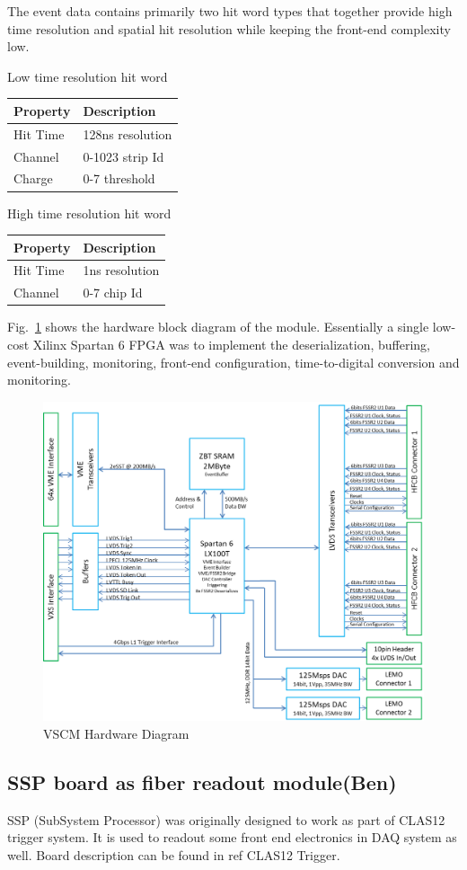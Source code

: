 The event data contains primarily two hit word types that together provide high time resolution and spatial hit resolution while keeping the front-end complexity low.

\begin{center}
	Low time resolution hit word\\
	\begin{tabular}{| l | l |}
		\hline \hline
		Property	& Description		\\
		\hline
		Hit Time	& 128ns resolution	\\
		Channel		& 0-1023 strip Id	\\
		Charge		& 0-7 threshold		\\
		\hline \hline
	\end{tabular}
\end{center}

\begin{center}
	High time resolution hit word\\
	\begin{tabular}{| l | l |}
		\hline \hline
		Property	& Description		\\
		\hline
		Hit Time	& 1ns resolution	\\
		Channel		& 0-7 chip Id		\\
		\hline \hline
	\end{tabular}
\end{center}

Fig.~\ref{fig:vscm_blockdiagram} shows the hardware block diagram of the module. Essentially a single low-cost Xilinx Spartan 6 FPGA was to implement the deserialization, buffering, event-building, monitoring, front-end configuration, time-to-digital conversion and monitoring.

\begin{figure}[hbt]
	\centering
	\includegraphics[width=1.0\columnwidth,keepaspectratio]{img/vscm_blockdiagram.png}
	\caption{VSCM Hardware Diagram}
	\label{fig:vscm_blockdiagram}
\end{figure}


\subsection{SSP board as fiber readout module(Ben)}

SSP (SubSystem Processor) was originally designed to work as part of CLAS12 trigger system. It is used to readout some front end electronics in DAQ system as well. Board description can be found in {ref CLAS12 Trigger}.